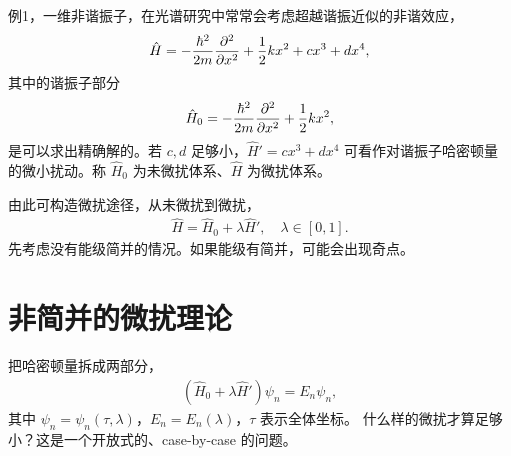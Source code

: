 例1，一维非谐振子，在光谱研究中常常会考虑超越谐振近似的非谐效应，
\begin{align}
    \hat H = -\frac{\hbar^2}{2m} \pdv[2]{x} + \frac12 kx^2 + cx^3 + dx^4,
\end{align}
其中的谐振子部分
\begin{align}
    \hat H_0 = -\frac{\hbar^2}{2m} \pdv[2]{x} + \frac12 kx^2, 
\end{align}
是可以求出精确解的。若 $c,d$ 足够小，$\hat H' = cx^3 + dx^4$ 可看作对谐振子哈密顿量的微小扰动。称 $\hat H_0$ 为未微扰体系、$\hat H$ 为微扰体系。

由此可构造微扰途径，从未微扰到微扰，
\begin{align}
    \hat H = \hat H_0 + \lambda \hat H', \quad \lambda\in[0,1]. 
\end{align}
先考虑没有能级简并的情况。如果能级有简并，可能会出现奇点。

\section{非简并的微扰理论}
把哈密顿量拆成两部分，
\begin{align}
    (\hat H_0 + \lambda \hat H') \psi_n = E_n \psi_n, 
    \label{eq:perb_bb_1}
\end{align}
其中 $\psi_n = \psi_n(\tau, \lambda)$，$E_n = E_n(\lambda)$，$\tau$ 表示全体坐标。 
什么样的微扰才算足够小？这是一个开放式的、case-by-case 的问题。

